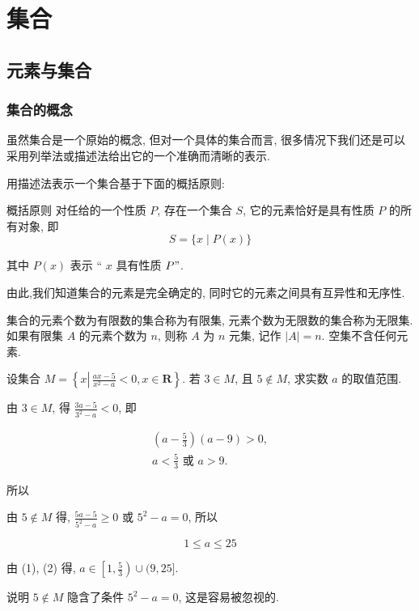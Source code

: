 \chapter{集合}
\section{元素与集合}
\subsection{集合的概念}
虽然集合是一个原始的概念, 但对一个具体的集合而言, 很多情况下我们还是可以采用列举法或描述法给出它的一个准确而清晰的表示.

用描述法表示一个集合基于下面的概括原则:

概括原则 对任给的一个性质 $P$, 存在一个集合 $S$, 它的元素恰好是具有性质 $P$ 的所有对象, 即
$$
	S=\{x \mid P(x)\}
$$

其中 $P(x)$ 表示 “ $x$ 具有性质 $P "$.

由此,我们知道集合的元素是完全确定的, 同时它的元素之间具有互异性和无序性.

集合的元素个数为有限数的集合称为有限集, 元素个数为无限数的集合称为无限集. 如果有限集 $A$ 的元素个数为 $n$, 则称 $A$ 为 $n$ 元集, 记作 $|A|=n$. 空集不含任何元素.

\begin{example}
	设集合 $M=\left\{x \left\lvert\, \frac{a x-5}{x^{2}-a}<0\right., x \in \mathbf{R}\right\}$. 若 $3 \in M$, 且 $5 \notin M$, 求实数 $a$ 的取值范围.
\end{example}
\begin{solution}
	由 $3 \in M$, 得 $\frac{3 a-5}{3^{2}-a}<0$, 即

	\begin{gather*}
		\left(a-\frac{5}{3}\right)(a-9)>0, \\
		a<\frac{5}{3} \text { 或 } a>9 . \tag{1}
	\end{gather*}


	所以

	由 $5 \notin M$ 得, $\frac{5 a-5}{5^{2}-a} \geqslant 0$ 或 $5^{2}-a=0$, 所以

	\begin{equation*}
		1 \leqslant a \leqslant 25 \tag{2}
	\end{equation*}


	由 (1), (2) 得, $a \in\left[1, \frac{5}{3}\right) \cup(9,25]$.

	说明 $5 \notin M$ 隐含了条件 $5^{2}-a=0$, 这是容易被忽视的.
\end{solution}

